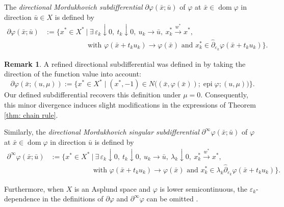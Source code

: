 \documentclass[12pt,twoside,reqno]{amsart}
\theoremstyle{definition}
\newtheorem{remark}[theorem]{Remark}
\numberwithin{equation}{section}
\begin{document}
The \emph{directional Mordukhovich subdifferential} $\partial \varphi(\bar{x}; \bar{u})$ of $\varphi$ at $\bar{x} \in \operatorname{dom}\varphi$ in direction $\bar{u} \in X$ is defined by
\begin{equation*}
\begin{aligned}
\partial \varphi(\bar{x}; \bar{u})
&:= 
\big\{
x^* \in X^* ~\big|~
\exists\, \varepsilon_k \downarrow 0,~ t_k \downarrow 0,~ u_k \to \bar{u},~
x_k^* \overset{w^*}{\to} x^*,\\
&\quad\quad\quad\quad\quad\quad\text{with } \varphi(\bar{x} + t_k u_k) \to \varphi(\bar{x}) 
\text{ and } x_k^* \in \widehat{\partial}_{\varepsilon_k}\varphi(\bar{x} + t_k u_k)
\big\}. 
\end{aligned}
\end{equation*}

\begin{remark}\label{rem:defn_of_other_directional_subdifferential}
A refined directional subdifferential was defined in \cite[(2)]{benko2019calculus} by taking the direction of the function value into account:
\begin{equation*}
\partial \varphi(\bar{x}; (u, \mu)) := \big\{ x^* \in X^* \;\big|\; (x^*, -1) \in N\big((\bar{x}, \varphi(\bar{x})); \operatorname{epi} \varphi; (u, \mu)\big) \big\}.
\end{equation*}
Our defined subdifferential recovers this definition under $\mu=0$. Consequently, this minor divergence induces slight modifications in the expressions of Theorem \ref{thm: chain rule}.
\end{remark}

Similarly, the \emph{directional Mordukhovich singular subdifferential} 
$\partial^{\infty}\varphi(\bar{x}; \bar{u})$ of $\varphi$ at $\bar{x} \in \operatorname{dom}\varphi$ in direction $\bar{u}$ is defined by
\begin{equation*}
\begin{aligned}
\partial^{\infty}\varphi(\bar{x}; \bar{u})
&:= 
\big\{
x^* \in X^* ~\big|~
\exists\, \varepsilon_k \downarrow 0,~ t_k \downarrow 0,~ u_k \to \bar{u},~ \lambda_k \downarrow 0,~
x_k^* \overset{w^*}{\to} x^*,\\
&\quad\quad\quad\quad\quad\quad\text{with } \varphi(\bar{x} + t_k u_k) \to \varphi(\bar{x}) 
\text{ and } x_k^* \in \lambda_k \widehat{\partial}_{\varepsilon_k}\varphi(\bar{x} + t_k u_k)
\big\}. 
\end{aligned}
\end{equation*}

Furthermore, when $X$ is an Asplund space and $\varphi$ is lower semicontinuous, the $\varepsilon_k$-dependence in the definitions of $\partial \varphi$ and $\partial^\infty \varphi$ can be omitted \cite[Theorem 2.34]{Mordukhovich2006variational}. 
\end{document}
